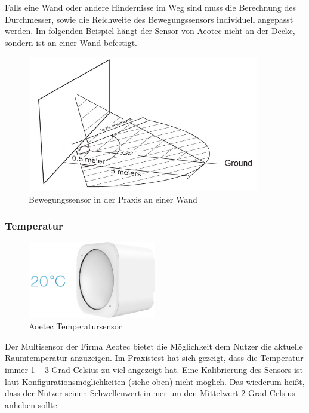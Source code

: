 Falls eine Wand oder andere Hindernisse im Weg sind muss die Berechnung des Durchmesser, sowie die Reichweite des Bewegungssensors individuell angepasst werden. Im folgenden Beispiel hängt der Sensor von Aeotec nicht an der Decke, sondern ist an einer Wand befestigt.

\begin{figure}[h!]
	\centering
	\includegraphics[width=0.9\textwidth]{img/Sensorevaluation/AeoMeter2.png}
	\caption{Bewegungssensor in der Praxis an einer Wand}
	\label{fig:sensorenAeoMeter2}
\end{figure}

\subsubsection{Temperatur}
\begin{figure}[h!]
	\centering
	\includegraphics[width=0.5\textwidth]{img/Sensorevaluation/AeoTemp.png}
	\caption{Aoetec Temperatursensor}
	\label{fig:sensorenAeoTemp}
\end{figure}

Der Multisensor der Firma Aeotec bietet die Möglichkeit dem Nutzer die aktuelle Raumtemperatur anzuzeigen. Im Praxistest hat sich gezeigt, dass die Temperatur immer 1 – 3 Grad Celsius zu viel angezeigt hat. Eine Kalibrierung des Sensors ist laut Konfigurationsmöglichkeiten (siehe oben) nicht möglich. Das wiederum heißt, dass der Nutzer seinen Schwellenwert immer um den Mittelwert 2 Grad Celsius anheben sollte.

